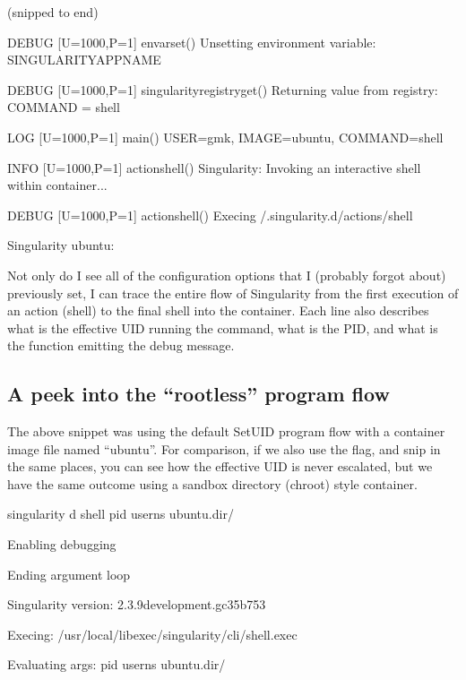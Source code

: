 \documentclass[letterpaper,10pt,english]{sphinxmanual}
\begin{document}
(snipped to end)

%
\begin{sphinxVerbatim}[commandchars=\\\{\}]
DEBUG   [U=1000,P=1]       envar\PYGZus{}set()                               Unsetting environment variable: SINGULARITY\PYGZus{}APPNAME

DEBUG   [U=1000,P=1]       singularity\PYGZus{}registry\PYGZus{}get()                Returning value from registry: \PYGZsq{}COMMAND\PYGZsq{} = \PYGZsq{}shell\PYGZsq{}

LOG     [U=1000,P=1]       main()                                    USER=gmk, IMAGE=\PYGZsq{}ubuntu\PYGZsq{}, COMMAND=\PYGZsq{}shell\PYGZsq{}

INFO    [U=1000,P=1]       action\PYGZus{}shell()                            Singularity: Invoking an interactive shell within container...


DEBUG   [U=1000,P=1]       action\PYGZus{}shell()                            Exec\PYGZsq{}ing /.singularity.d/actions/shell

Singularity ubuntu:\PYGZti{}\PYGZgt{}
\end{sphinxVerbatim}

Not only do I see all of the configuration options that I (probably
forgot about) previously set, I can trace the entire flow of Singularity
from the first execution of an action (shell) to the final shell into
the container. Each line also describes what is the effective UID
running the command, what is the PID, and what is the function emitting
the debug message.


\subsection{A peek into the “rootless” program flow}
\label{\detokenize{security:a-peek-into-the-rootless-program-flow}}
The above snippet was using the default SetUID program flow with a
container image file named “ubuntu”. For comparison, if we also use the 
flag, and snip in the same places, you can see how the effective UID is
never escalated, but we have the same outcome using a sandbox directory
(chroot) style container.

%
\begin{sphinxVerbatim}[commandchars=\\\{\}]
\PYGZdl{} singularity \PYGZhy{}d shell \PYGZhy{}\PYGZhy{}pid \PYGZhy{}\PYGZhy{}userns ubuntu.dir/

Enabling debugging

Ending argument loop

Singularity version: 2.3.9\PYGZhy{}development.gc35b753

Exec\PYGZsq{}ing: /usr/local/libexec/singularity/cli/shell.exec

Evaluating args: \PYGZsq{}\PYGZhy{}\PYGZhy{}pid \PYGZhy{}\PYGZhy{}userns ubuntu.dir/\PYGZsq{}
\end{sphinxVerbatim}
\end{document}
